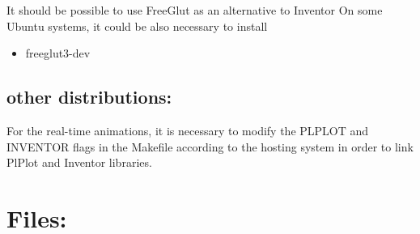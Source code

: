 It should be possible to use FreeGlut as an alternative to Inventor On some Ubuntu systems, it could be also necessary to install\begin{itemize}
\item freeglut3-dev\end{itemize}
\hypertarget{index_compile_other}{}\subsection{other distributions:}\label{index_compile_other}
For the real-time animations, it is necessary to modify the PLPLOT and INVENTOR flags in the Makefile according to the hosting system in order to link PlPlot and Inventor libraries.\hypertarget{index_dirs}{}\section{Files:}\label{index_dirs}

